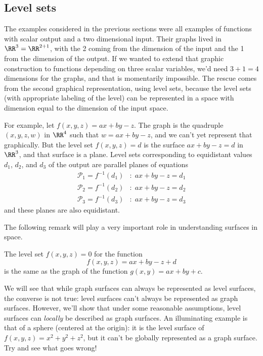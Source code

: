 \subsection{Level sets}
The examples considered in the previous sections were all
examples of functions with scalar output and a two
dimensional input. Their graphs lived in
$\RR^3 = \RR^{2+1}$, with the 2 coming from the dimension
of the input and the 1 from the dimension of the output.
If we wanted to extend that graphic construction to
functions depending on three scalar variables,
we'd need $3+1=4$ dimensions for the graphs, and that
is momentarily impossible. The rescue comes from the
second graphical representation, using level sets,
because the level sets (with appropriate labeling of
the level) can be represented in a space with dimension
equal to the dimension of the input space.


For example, let $f(x,y,z) = ax+by-z$. The graph is the
quadruple $(x,y,z,w)$ in $\RR^4$ such that
$w = ax+by-z$, and we can't yet represent that
graphically. But the level set $f(x,y,z) = d$ is the
surface $ax+by-z = d$ in $\RR^3$, and that surface is a
plane. Level sets corresponding to equidistant values
$d_1$, $d_2$, and $d_3$ of the output are parallel
planes of equations
%
\begin{align*}
  \mathcal{P}_1 = f^{-1}(d_1) & \colon \; ax+by-z = d_1\\
  \mathcal{P}_2 = f^{-1}(d_2) & \colon \; ax+by-z = d_2\\
  \mathcal{P}_3 = f^{-1}(d_3) & \colon \; ax+by-z = d_3
\end{align*}
%
and these planes are also equidistant.

The following remark will play a very important role in
understanding surfaces in space.

\begin{remark}{\rm The level set $f(x,y,z)=0$ for the
function
%
$$f(x,y,z) = ax+by-z+d$$
%
is the same as the graph
of the function $g(x,y) = ax+by+c$.
}\end{remark}

We will see that while graph surfaces can always be
represented as level surfaces, the converse is not true:
level surfaces can't always be represented as graph
surfaces. However, we'll show that under some reasonable
assumptions, level surfaces can \emph{locally} be
described as graph surfaces. An illuminating example is
that of a sphere (centered at the origin): it is the
level surface of $f(x,y,z) = x^2+y^2+z^2$, but it can't
be globally represented as a graph surface. Try and see
what goes wrong!

